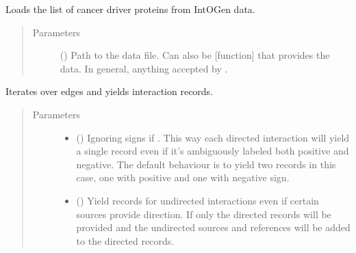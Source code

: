 \documentclass[letterpaper,10pt,english]{sphinxmanual}
\begin{document}
\begin{fulllineitems}
\begin{fulllineitems}
\label{\detokenize{reference:pypath.main.PyPath.intogen_cancer_drivers_list}}
Loads the list of cancer driver proteins from IntOGen data.
\begin{quote}\begin{description}
\item[{Parameters}] \leavevmode
{} () \textendash{} Path to the data file. Can also be {[}function{]} that provides
the data. In general, anything accepted by
.

\end{description}\end{quote}

\end{fulllineitems}


\begin{fulllineitems}
\label{\detokenize{reference:pypath.main.PyPath.iter_interactions}}
Iterates over edges and yields interaction records.
\begin{quote}\begin{description}
\item[{Parameters}] \leavevmode\begin{itemize}
\item {} 
 () \textendash{} Ignoring signs if . This way each directed interaction
will yield a single record even if it’s ambiguously labeled
both positive and negative. The default behaviour is to yield
two records in this case, one with positive and one with negative
sign.

\item {} 
 () \textendash{} Yield records for undirected interactions even if certain sources
provide direction. If  only the directed records will
be provided and the undirected sources and references will be
added to the directed records.


\end{itemize}
\end{description}
\end{quote}
\end{fulllineitems}
\end{fulllineitems}
\end{document}
